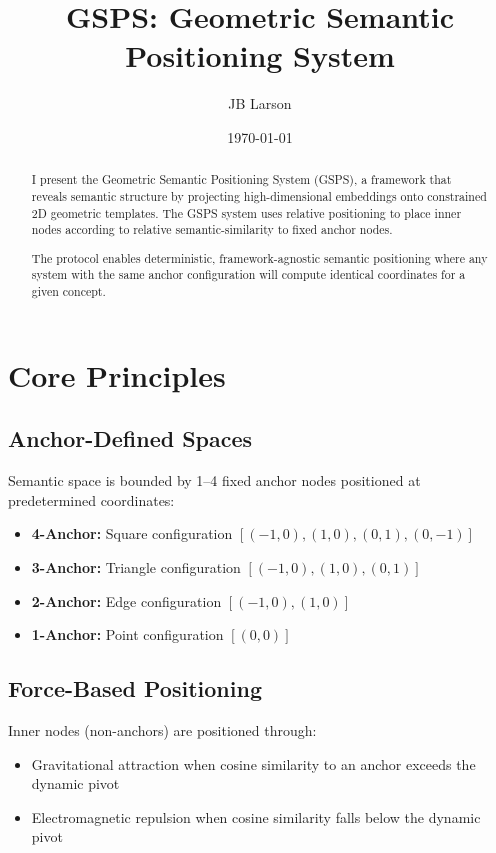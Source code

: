 \documentclass[11pt]{article}
\title{GSPS: Geometric Semantic Positioning System}
\author{JB Larson}
\date{\today}
\begin{document}
\maketitle

\begin{abstract}
I present the Geometric Semantic Positioning System (GSPS), a framework that reveals semantic structure by projecting high-dimensional embeddings onto constrained 2D geometric templates. The GSPS system uses relative positioning to place inner nodes according to relative semantic-similarity to fixed anchor nodes.

The protocol enables deterministic, framework-agnostic semantic positioning where any system with the same anchor configuration will compute identical coordinates for a given concept.
\end{abstract}

\section{Core Principles}

\subsection{Anchor-Defined Spaces}

Semantic space is bounded by 1--4 fixed anchor nodes positioned at predetermined coordinates:

\begin{itemize}
    \item \textbf{4-Anchor:} Square configuration $[(-1,0), (1,0), (0,1), (0,-1)]$
    \item \textbf{3-Anchor:} Triangle configuration $[(-1,0), (1,0), (0,1)]$
    \item \textbf{2-Anchor:} Edge configuration $[(-1,0), (1,0)]$
    \item \textbf{1-Anchor:} Point configuration $[(0,0)]$
\end{itemize}

\subsection{Force-Based Positioning}

Inner nodes (non-anchors) are positioned through:

\begin{itemize}
    \item Gravitational attraction when cosine similarity to an anchor exceeds the dynamic pivot
    \item Electromagnetic repulsion when cosine similarity falls below the dynamic pivot
\end{itemize}
\end{document}
